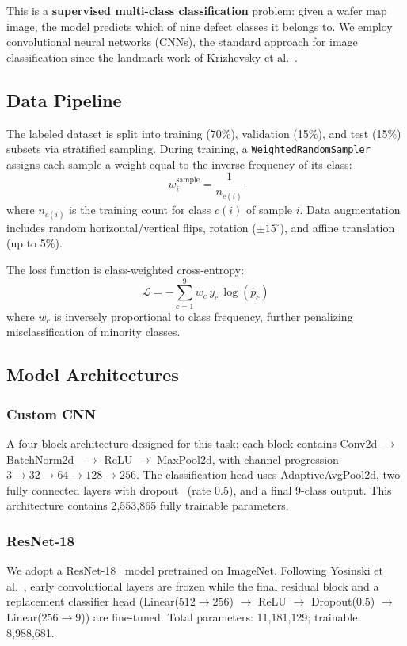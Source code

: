 \documentclass[conference]{IEEEtran}
\begin{document}
This is a \textbf{supervised multi-class classification} problem: given a
wafer map image, the model predicts which of nine defect classes it belongs
to. We employ convolutional neural networks (CNNs), the standard approach for
image classification since the landmark work of Krizhevsky et
al.~\cite{krizhevsky2012}.

\subsection{Data Pipeline}

The labeled dataset is split into training (70\%), validation (15\%), and test
(15\%) subsets via stratified sampling. During training, a
\texttt{WeightedRandomSampler} assigns each sample a weight equal to the
inverse frequency of its class:
\begin{equation}
w_i^{\text{sample}} = \frac{1}{n_{c(i)}}
\label{eq:sample_weight}
\end{equation}
where $n_{c(i)}$ is the training count for class $c(i)$ of sample $i$.
Data augmentation includes random horizontal/vertical flips, rotation
($\pm 15^\circ$), and affine translation (up to 5\%).

The loss function is class-weighted cross-entropy:
\begin{equation}
\mathcal{L} = -\sum_{c=1}^{9} w_c \, y_c \, \log(\hat{p}_c)
\label{eq:weighted_ce}
\end{equation}
where $w_c$ is inversely proportional to class frequency, further penalizing
misclassification of minority classes.

\subsection{Model Architectures}

\subsubsection{Custom CNN}
A four-block architecture designed for this task: each block contains
Conv2d $\to$ BatchNorm2d~\cite{ioffe2015} $\to$ ReLU $\to$ MaxPool2d, with
channel progression $3 \to 32 \to 64 \to 128 \to 256$. The classification
head uses AdaptiveAvgPool2d, two fully connected layers with
dropout~\cite{srivastava2014} (rate 0.5), and a final 9-class output.
This architecture contains 2{,}553{,}865 fully trainable parameters.

\subsubsection{ResNet-18}
We adopt a ResNet-18~\cite{he2016} model pretrained on ImageNet. Following
Yosinski et al.~\cite{yosinski2014}, early convolutional layers are frozen
while the final residual block and a replacement classifier head
(Linear($512 \to 256$) $\to$ ReLU $\to$ Dropout(0.5) $\to$ Linear($256 \to
9$)) are fine-tuned. Total parameters: 11{,}181{,}129; trainable:
8{,}988{,}681.
\end{document}
